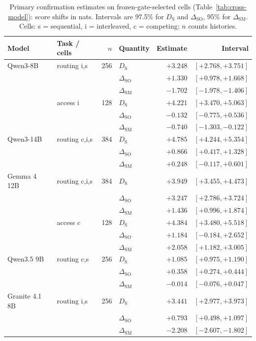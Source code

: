 \begin{table}[t]
\centering
\small
\setlength{\tabcolsep}{5pt}
\begin{tabular}{@{}llrlrr@{}}
\toprule
Model & Task / cells & $n$ & Quantity & Estimate & Interval \\
\midrule
Qwen3-8B & routing i,s & 256 & $D_{\mathrm{S}}$ & $+3.248$ & $[+2.768, +3.751]$ \\
 &  &  & $\Delta_{\mathrm{SO}}$ & $+1.330$ & $[+0.978, +1.668]$ \\
 &  &  & $\Delta_{\mathrm{SM}}$ & $-1.702$ & $[-1.978, -1.406]$ \\
 & access i & 128 & $D_{\mathrm{S}}$ & $+4.221$ & $[+3.470, +5.063]$ \\
 &  &  & $\Delta_{\mathrm{SO}}$ & $-0.132$ & $[-0.775, +0.536]$ \\
 &  &  & $\Delta_{\mathrm{SM}}$ & $-0.740$ & $[-1.303, -0.122]$ \\
\midrule
Qwen3-14B & routing c,i,s & 384 & $D_{\mathrm{S}}$ & $+4.785$ & $[+4.244, +5.354]$ \\
 &  &  & $\Delta_{\mathrm{SO}}$ & $+0.866$ & $[+0.417, +1.328]$ \\
 &  &  & $\Delta_{\mathrm{SM}}$ & $+0.248$ & $[-0.117, +0.601]$ \\
\midrule
Gemma 4 12B & routing c,i,s & 384 & $D_{\mathrm{S}}$ & $+3.949$ & $[+3.455, +4.473]$ \\
 &  &  & $\Delta_{\mathrm{SO}}$ & $+3.247$ & $[+2.786, +3.724]$ \\
 &  &  & $\Delta_{\mathrm{SM}}$ & $+1.436$ & $[+0.996, +1.874]$ \\
 & access c & 128 & $D_{\mathrm{S}}$ & $+4.384$ & $[+3.480, +5.518]$ \\
 &  &  & $\Delta_{\mathrm{SO}}$ & $+1.184$ & $[-0.184, +2.652]$ \\
 &  &  & $\Delta_{\mathrm{SM}}$ & $+2.058$ & $[+1.182, +3.005]$ \\
\midrule
Qwen3.5 9B & routing c,s & 256 & $D_{\mathrm{S}}$ & $+1.085$ & $[+0.975, +1.190]$ \\
 &  &  & $\Delta_{\mathrm{SO}}$ & $+0.358$ & $[+0.274, +0.444]$ \\
 &  &  & $\Delta_{\mathrm{SM}}$ & $-0.014$ & $[-0.076, +0.047]$ \\
\midrule
Granite 4.1 8B & routing i,s & 256 & $D_{\mathrm{S}}$ & $+3.441$ & $[+2.977, +3.973]$ \\
 &  &  & $\Delta_{\mathrm{SO}}$ & $+0.793$ & $[+0.498, +1.097]$ \\
 &  &  & $\Delta_{\mathrm{SM}}$ & $-2.208$ & $[-2.607, -1.802]$ \\
\bottomrule
\end{tabular}
\caption{Primary confirmation estimates on frozen-gate-selected cells (Table~\ref{tab:cross-model}): score shifts in nats. Intervals are 97.5\% for $D_{\mathrm{S}}$ and $\Delta_{\mathrm{SO}}$, 95\% for $\Delta_{\mathrm{SM}}$. Cells: s = sequential, i = interleaved, c = competing; $n$ counts histories.}
\label{tab:cross-model-ci}
\end{table}

